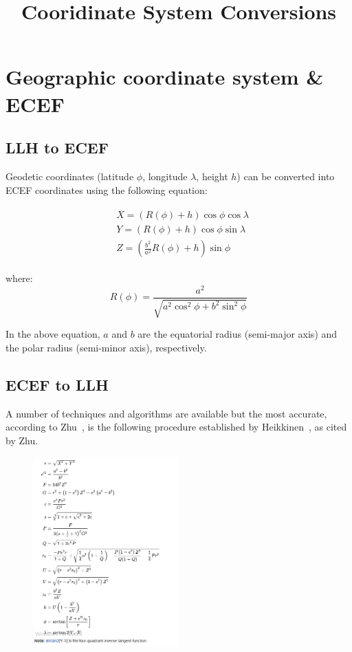 \documentclass{article}
\begin{document}
\title{Cooridinate System Conversions}
\maketitle
\section{Geographic coordinate system \& ECEF}

\subsection{LLH to ECEF}

Geodetic coordinates (latitude  $\phi$, longitude   $\lambda$, height $h$) can
be converted into ECEF coordinates using the following equation:

\begin{align*}
\begin{split}
& X = ( R(\phi) + h) \cos \phi \cos \lambda \\ 
& Y = ( R(\phi) + h) \cos \phi \sin \lambda \\
& Z = ( \frac{b^2}{a^2}R(\phi) + h) \sin \phi 
\end{split}
\end{align*}

where:
\begin{equation}
R(\phi) = \frac{a^2}{\sqrt{a^2 \cos ^2 \phi + b^2 \sin ^2 \phi}}
\end{equation}

In the above equation, $a$ and $b$ are the equatorial radius
(semi-major axis) and the polar radius (semi-minor axis), respectively.

\subsection{ECEF to LLH}
A number of techniques and algorithms are available but the most accurate,
according to Zhu~\cite{zhu}, is the following procedure established by
Heikkinen~\cite{heikkinen1982geschlossene}, as cited by Zhu.


\begin{figure}[h]\label{fig:ecef2llh}
\includegraphics[width=0.5\textwidth,height=0.5\textheight,keepaspectratio]{figures/ecef2llh}
\end{figure}
\end{document}
